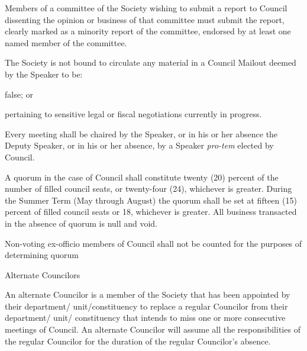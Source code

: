 \begin{longenum}[ label*=\thesubsection.\arabic*., align=left]
\begin{longenum}[ label*=\arabic*., align=left]
        \item Members of a committee of the Society wishing to submit a report to Council dissenting the opinion or business of that committee must submit the report, clearly marked as a minority report of the committee, endorsed by at least one named member of the committee. 
	\end{longenum}
    \item The Society is not bound to circulate any material in a Council Mailout deemed by the Speaker to be:
    \begin{longenum}[ label*=\arabic*., align=left]
		\item false; or
        \item pertaining to sensitive legal or fiscal negotiations currently in progress.
	\end{longenum}
    \item Every meeting shall be chaired by the Speaker, or in his or her absence the Deputy Speaker, or in his or her absence, by a Speaker \textit{pro-tem} elected by Council.
    \item A quorum in the case of Council shall constitute twenty (20) percent of the number of filled council seats, or twenty-four (24), whichever is greater. During the Summer Term (May through August) the quorum shall be set at fifteen (15) percent of filled council seats or 18, whichever is greater. All business transacted in the absence of quorum is null and void.
    \item Non-voting ex-officio members of Council shall not be counted for the purposes of determining quorum
    \item Alternate Councilors
    \begin{longenum}[ label*=\arabic*., align=left]
		\item An alternate Councilor is a member of the Society that has been appointed by their department/ unit/constituency to replace a regular Councilor from their department/ unit/ constituency that intends to miss one or more consecutive meetings of Council. An alternate Councilor will assume all the responsibilities of the regular Councilor for the duration of the regular Councilor's absence.

\end{longenum}
\end{longenum}
